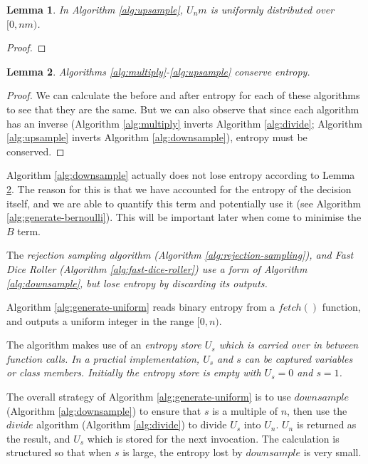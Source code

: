 \documentclass[12pt]{article}
\newtheorem{lemma}{Lemma}
\begin{document}
\begin{lemma}
In Algorithm \ref{alg:upsample}, $U_nm$ is uniformly distributed over $[0,nm)$.
\end{lemma}

\begin{proof}
\end{proof}

\begin{lemma}
\label{lem:conservation}
Algorithms \ref{alg:multiply}-\ref{alg:upsample} conserve entropy.
\end{lemma}

\begin{proof}
We can calculate the before and after entropy for each of these algorithms to see that they are the same. But we can also observe that since each algorithm has an inverse (Algorithm \ref{alg:multiply} inverts Algorithm \ref{alg:divide}; Algorithm \ref{alg:upsample} inverts Algorithm \ref{alg:downsample}), entropy must be conserved.
\end{proof}

Algorithm \ref{alg:downsample} actually does not lose entropy according to Lemma \ref{lem:conservation}. The reason for this is that we have accounted for the entropy of the decision itself, and we are able to quantify this term and potentially use it (see Algorithm \ref{alg:generate-bernoulli}). This will be important later when come to minimise the $B$ term.

The \em rejection sampling \em algorithm (Algorithm \ref{alg:rejection-sampling}), and Fast Dice Roller (Algorithm \ref{alg:fast-dice-roller}) use a form of Algorithm \ref{alg:downsample}, but lose entropy by discarding its outputs.

Algorithm \ref{alg:generate-uniform} reads binary entropy from a $fetch()$ function, and outputs a uniform integer in the range $[0,n)$. 

The algorithm makes use of an \em entropy store \em $U_s$ which is carried over in between function calls. In a practial implementation, $U_s$ and $s$ can be captured variables or class members. Initially the entropy store is empty with $U_s = 0$ and $s=1$.

The overall strategy of Algorithm \ref{alg:generate-uniform} is to use $downsample$ (Algorithm \ref{alg:downsample}) to ensure that $s$ is a multiple of $n$, then use the $divide$ algorithm (Algorithm \ref{alg:divide}) to divide $U_s$ into $U_n$. $U_n$ is returned as the result, and $U_s$ which is stored for the next invocation. The calculation is structured so that when $s$ is large, the entropy lost by $downsample$ is very small.
\end{document}
